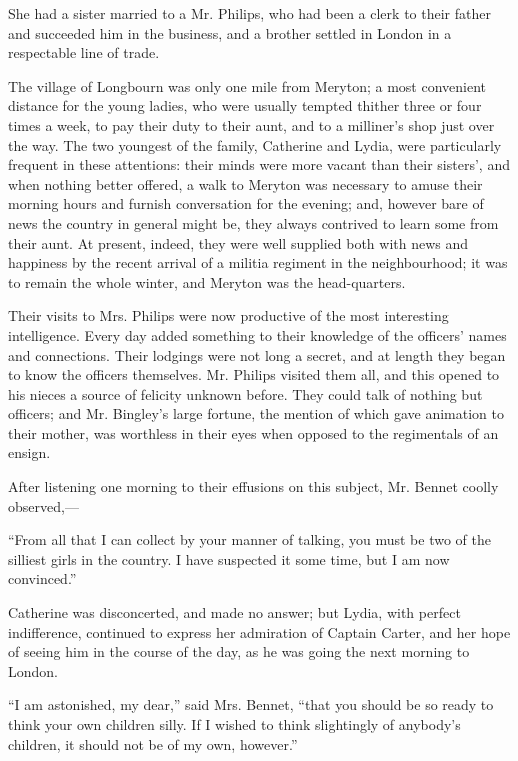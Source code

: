 \documentclass[10pt]{book}
\begin{document}
   She had a sister married to a Mr. Philips, who had been a clerk to their
father and succeeded him in the business, and a brother settled in
London in a respectable line of trade.
  

   The village of Longbourn was only one mile from Meryton; a most
convenient distance for the young ladies, who were usually tempted
thither three or four times a week, to pay their duty to their aunt, and
to a milliner’s shop just over the way. The two youngest of the family,
Catherine and Lydia, were particularly frequent in these attentions:
their minds were more vacant than their sisters’, and when nothing
better offered, a walk to Meryton was necessary to amuse their morning
hours and furnish conversation for the evening; and, however bare of
news the country in general might be, they always contrived to learn
some from their aunt. At present, indeed, they were well supplied both
with news and happiness by the recent arrival of a militia regiment in
the neighbourhood; it was to remain the whole winter, and Meryton was
the head-quarters.
  

   Their visits to Mrs. Philips were now productive of the most interesting
intelligence. Every day added something to their knowledge of the
officers’ names and connections. Their lodgings were not long a secret,
and at length they began to know the officers themselves. Mr. Philips
visited them all, and this opened to his nieces a source of felicity
unknown before. They could talk of nothing but officers; and Mr.
Bingley’s large fortune, the mention of which gave animation to their
mother, was worthless in their eyes when opposed to the regimentals of
an ensign.
  

   After listening one morning to their effusions on this subject, Mr.
Bennet coolly observed,—
  

   “From all that I can collect by your manner of talking, you must be two
of the silliest girls in the country. I have suspected it some time, but
I am now convinced.”
  

   Catherine was disconcerted, and made no answer; but Lydia, with perfect
indifference, continued to express her admiration of Captain Carter, and
her hope of seeing him in the course of the day, as he was going the
next morning to London.
  

   “I am astonished, my dear,” said Mrs. Bennet, “that you should be so
ready to think your own children silly. If I wished to think slightingly
of anybody’s children, it should not be of my own, however.”
  
\end{document}
